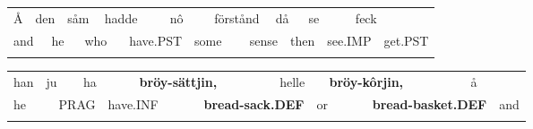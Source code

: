 \begin{styleExText}

\end{styleExText}

\begin{tabular}{llllllllllllllllll}
\lsptoprule
Å & \multicolumn{2}{l}{den

} & \multicolumn{2}{l}{såm

} & \multicolumn{2}{l}{hadde

} & \multicolumn{2}{l}{nô

} & \multicolumn{2}{l}{förstånd

} & \multicolumn{2}{l}{då

} & \multicolumn{2}{l}{se

} & \multicolumn{2}{l}{feck

} & \\
\multicolumn{2}{l}{and

} & \multicolumn{2}{l}{he

} & \multicolumn{2}{l}{who

} & \multicolumn{2}{l}{have.PST

} & \multicolumn{2}{l}{some

} & \multicolumn{2}{l}{sense

} & \multicolumn{2}{l}{then

} & \multicolumn{2}{l}{see.IMP

} & \multicolumn{2}{l}{get.PST

}\\
\lspbottomrule
\end{tabular}

\begin{tabular}{llllllllllllll}
\lsptoprule
han & \multicolumn{2}{l}{ju

} & \multicolumn{2}{l}{ha

} & \multicolumn{2}{l}{{\bfseries bröy-sättjin,}

} & \multicolumn{2}{l}{helle

} & \multicolumn{2}{l}{{\bfseries bröy-kôrjin,}

} & \multicolumn{2}{l}{å

} & \\
\multicolumn{2}{l}{he

} & \multicolumn{2}{l}{PRAG

} & \multicolumn{2}{l}{have.INF

} & \multicolumn{2}{l}{{\bfseries bread-sack.DEF}

} & \multicolumn{2}{l}{or

} & \multicolumn{2}{l}{{\bfseries bread-basket.DEF}

} & \multicolumn{2}{l}{and

}\\
\lspbottomrule
\end{tabular}

